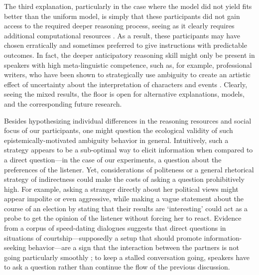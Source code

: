\documentclass[11pt,a4paper]{article}
\newcommand{\gcs}[1]{\textcolor{blue}{[gcs: #1]}}
\begin{document}
The third explanation, particularly in the case where the model did not yield fits better than the uniform model, is simply that these participants did not gain access to the required deeper reasoning process, seeing as it clearly requires additional computational resources \cite{Lieder:2020}.
As a result, these participants may have chosen erratically and sometimes preferred to give instructions with predictable outcomes. 
In fact, the deeper anticipatory reasoning skill might only be present in speakers with high meta-linguistic competence, such as, for example, professional writers, who have been shown to strategically use ambiguity to create an artistic effect of uncertainty about the interpretation of characters and events \cite{bade2015ambiguity, bauer2014dickens, quigley2015modernist}.
Clearly, seeing the mixed results, the floor is open for alternative explanations, models, and the corresponding future research. 


Besides hypothesizing individual differences in the reasoning resources and social focus of our participants, 
one might question the ecological validity of such epistemically-motivated ambiguity behavior in general.
Intuitively, such a strategy appears to be a sub-optimal way to elicit information when compared to a direct question---in the case of our experiments, a question about the preferences of the listener.
Yet, considerations of politeness \cite{yoon2018polite} or a general rhetorical strategy of indirectness could make the costs of asking a question prohibitively high.
For example, asking a stranger directly about her political views might appear impolite or even aggressive, while making a vague statement about the course of an election by stating that their results are `interesting' could act as a probe to get the opinion of the listener without forcing her to react.
Evidence from a corpus of speed-dating dialogues suggests that direct questions in situations of courtship---supposedly a setup that should promote information-seeking behavior---are a sign that the interaction between the partners is not going particularly smoothly \cite{mcfarland2013making}; to keep a stalled conversation going, speakers have to ask a question rather than continue the flow of the previous discussion.
\end{document}
